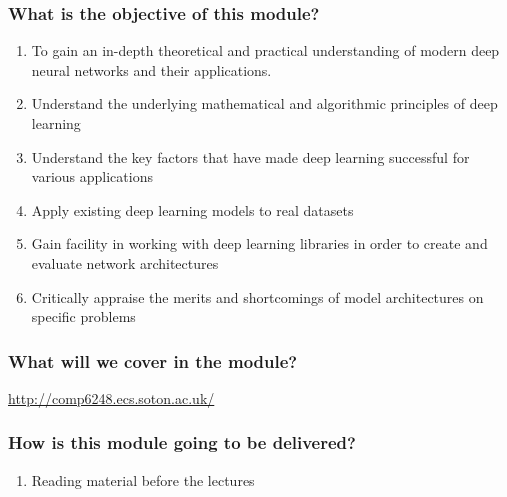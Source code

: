 \documentclass[\beamerclass]{beamer}
\begin{document}
\begin{frame}
	\frametitle{What is the objective of this module?}
	\begin{enumerate}
		\item To gain an in-depth theoretical and practical understanding of modern deep neural networks and their applications.
		\item Understand the underlying mathematical and algorithmic principles of deep learning
		\item Understand the key factors that have made deep learning successful for various applications
		\item Apply existing deep learning models to real datasets
		\item Gain facility in working with deep learning libraries in order to create and evaluate network architectures
		\item Critically appraise the merits and shortcomings of model architectures on specific problems
	\end{enumerate}
\end{frame}


\begin{frame}
	\frametitle{What will we cover in the module?}
	\url{http://comp6248.ecs.soton.ac.uk/}
\end{frame}

\begin{frame}
	\frametitle{How is this module going to be delivered?}
	
	\begin{enumerate}
	\item Reading material before the lectures
	\end{enumerate}
\end{frame}
\end{document}
